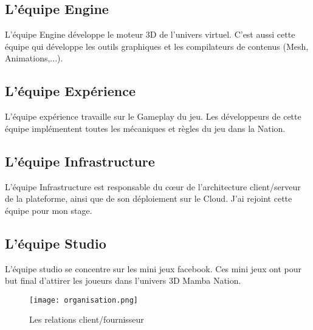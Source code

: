 \subsection{L'équipe Engine}
L'équipe Engine développe le moteur 3D de l'univers virtuel.
C'est aussi cette équipe qui développe les outils graphiques et les compilateurs
de contenus (Mesh, Animations,...).


\subsection{L'équipe Expérience}

L'équipe expérience travaille sur le Gameplay du jeu. Les développeurs de cette
équipe implémentent toutes les mécaniques et règles du jeu dans la Nation.

\subsection{L'équipe Infrastructure}
L'équipe Infrastructure est responsable du cœur de l'architecture client/serveur
de la plateforme, ainsi que de son déploiement sur le Cloud.
J'ai rejoint cette équipe pour mon stage.

\subsection{L'équipe Studio}

L'équipe studio se concentre sur les mini jeux facebook. Ces mini jeux ont pour
but final d'attirer les joueurs dans l'univers 3D Mamba Nation.


\begin{figure}[H]
  \begin{center}
    \texttt{[image: organisation.png]}   
  \end{center}
  \caption{Les relations client/fournisseur}
\end{figure}

